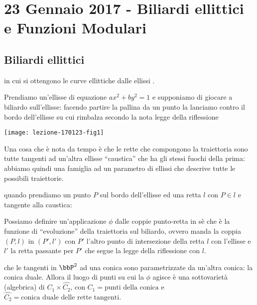 \chapter{23 Gennaio 2017 - Biliardi ellittici e Funzioni Modulari}
\justify

\section{Biliardi ellittici}
 in cui si ottengono le curve
ellittiche dalle ellissi .

Prendiamo un'ellisse di equazione $ax^2 + by^2 = 1$ e supponiamo di
giocare a biliardo sull'ellisse: facendo partire la pallina da un punto
la lanciamo contro il bordo dell'ellisse su cui rimbalza secondo la nota
legge della riflessione 

\begin{center}
  \texttt{[image: lezione-170123-fig1]}
\end{center}
  
Una cosa che è nota da tempo è che le rette che compongono la
traiettoria sono tutte tangenti ad un'altra ellisse ``caustica'' che ha
gli stessi fuochi della prima: abbiamo quindi una famiglia ad un
parametro di ellissi che descrive tutte le possibili traiettorie.

 quando prendiamo un punto $P$
sul bordo dell'ellisse ed una retta $l$ con $P \in l$ e tangente alla
caustica:

Possiamo definire un'applicazione $\phi$ dalle coppie punto-retta in sè
che è la funzione di ``evoluzione'' della traiettoria sul biliardo,
ovvero manda la coppia $(P, l)$ in $(P', l')$ con $P'$ l'altro punto di
intersezione della retta $l$ con l'ellisse e $l'$ la retta passante per
$P'$ che segue la legge della riflessione con $l$.


 che le tangenti in $\bbP^2$ ad una conica sono
parametrizzate da un'altra conica: la conica duale.
Allora il luogo di punti su cui la $\phi$ agisce è una sottovarietà
(algebrica) di $C_1 \times \hat{C_2}$, con $C_1 = \text{punti della
  conica}$ e $\hat{C_2} = \text{conica duale delle rette tangenti}$.

